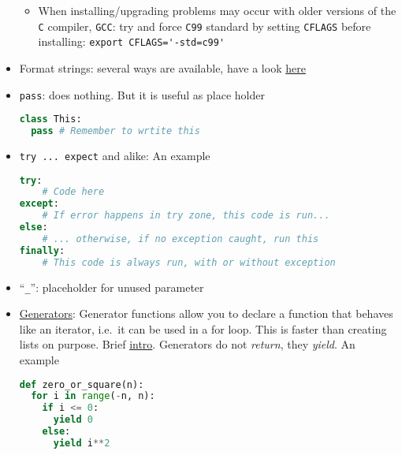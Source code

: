 \documentclass[a4paper,12pt,%
              final%
              ]{article}
\begin{document}
\begin{itemize}
\begin{itemize}
      \item When installing/upgrading problems may occur with older versions of the \texttt{C} compiler, \texttt{GCC}: try and force \texttt{C99} standard by setting \texttt{CFLAGS} before installing: \verb|export CFLAGS='-std=c99'|
    \end{itemize}
  \item Format strings: several ways are available, have a look \href{https://realpython.com/python-string-formatting/}{here}
  \item \verb|pass|: does nothing. But it is useful as place holder
\begin{lstlisting}[language=python]
class This:
  pass # Remember to wrtite this
\end{lstlisting}
  \item \verb|try ... expect| and alike: An example
\begin{lstlisting}[language=python]
try:
    # Code here
except:
    # If error happens in try zone, this code is run...
else:
    # ... otherwise, if no exception caught, run this
finally:
    # This code is always run, with or without exception
\end{lstlisting}
  \item ``\verb|_|'': placeholder for unused parameter
  \item \href{https://wiki.python.org/moin/Generators}{Generators}: Generator functions allow you to declare a function that behaves like an iterator, i.e.~it can be used in a for loop. This is faster than creating lists on purpose. Brief \href{https://www.programiz.com/python-programming/generator}{intro}. Generators do not \emph{return}, they \emph{yield}. An example
\begin{lstlisting}[language=python]
def zero_or_square(n):
  for i in range(-n, n):
    if i <= 0:
      yield 0
    else:
      yield i**2


\end{lstlisting}
\end{itemize}
\end{document}

